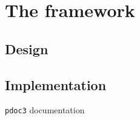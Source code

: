 \chapter{The framework}
\label{chap:framework}
\section{Design}
\todo
\section{Implementation}
\todo

\texttt{pdoc3} documentation